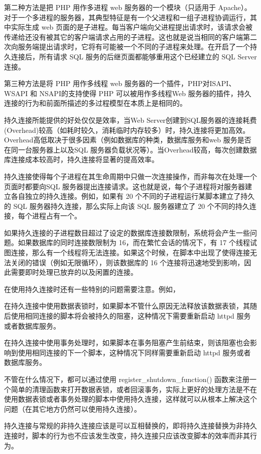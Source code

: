 第二种方法是把 PHP 用作多进程 web 服务器的一个模块（只适用于 Apache）。对于一个多进程的服务器，其典型特征是有一个父进程和一组子进程协调运行，其中实际生成 web 页面的是子进程。每当客户端向父进程提出请求时，该请求会被传递给还没有被其它的客户端请求占用的子进程。这也就是说当相同的客户端第二次向服务端提出请求时，它将有可能被一个不同的子进程来处理。在开启了一个持久连接后，所有请求 SQL 服务的后继页面都能够重用这个已经建立的 SQL Server 连接。


第三种方法是将 PHP 用作多线程 web 服务器的一个插件，PHP对ISAPI、WSAPI 和 NSAPI的支持使得 PHP 可以被用作多线程Web 服务器的插件，持久连接的行为和前面所描述的多过程模型在本质上是相同的。

持久连接所能提供的好处仅仅是效率，当Web Server创建到SQL服务器的连接耗费(Overhead)较高（如耗时较久，消耗临时内存较多）时，持久连接将更加高效。Overhead高低取决于很多因素（例如数据库的种类，数据库服务和web 服务是否在同一台服务器上以及SQL 服务器负载状况等）。当Overhead较高，每次创建数据库连接成本较高时，持久连接将显著的提高效率。

持久连接使得每个子进程在其生命周期中只做一次连接操作，而非每次在处理一个页面时都要向SQL 服务器提出连接请求。这也就是说，每个子进程将对服务器建立各自独立的持久连接。例如，如果有 20 个不同的子进程运行某脚本建立了持久的 SQL 服务器持久连接，那么实际上向该 SQL 服务器建立了 20 个不同的持久连接，每个进程占有一个。

如果持久连接的子进程数目超过了设定的数据库连接数限制，系统将会产生一些问题。如果数据库的同时连接数限制为 16，而在繁忙会话的情况下，有 17 个线程试图连接，那么有一个线程将无法连接。如果这个时候，在脚本中出现了使得连接无法关闭的错误（例如无限循环），则该数据库的 16 个连接将迅速地受到影响，因此需要即时处理已放弃的以及闲置的连接。

在使用持久连接时还有一些特别的问题需要注意。例如，

在持久连接中使用数据表锁时，如果脚本不管什么原因无法释放该数据表锁，其随后使用相同连接的脚本将会被持久的阻塞，这种情况下需要重新启动 httpd 服务或者数据库服务。

在持久连接中使用事务处理时，如果脚本在事务阻塞产生前结束，则该阻塞也会影响到使用相同连接的下一个脚本，这种情况下同样需要重新启动 httpd 服务或者数据库服务。


不管在什么情况下，都可以通过使用 register\_shutdown\_function() 函数来注册一个简单的清理函数来打开数据表锁，或者回滚事务，实际上更好的处理方法是不在使用数据表锁或者事务处理的脚本中使用持久连接，这样就可以从根本上解决这个问题（在其它地方仍然可以使用持久连接）。

持久连接与常规的非持久连接应该是可以互相替换的，即将持久连接替换为非持久连接时，脚本的行为也不应该发生改变，持久连接只应该改变脚本的效率而非其行为。






